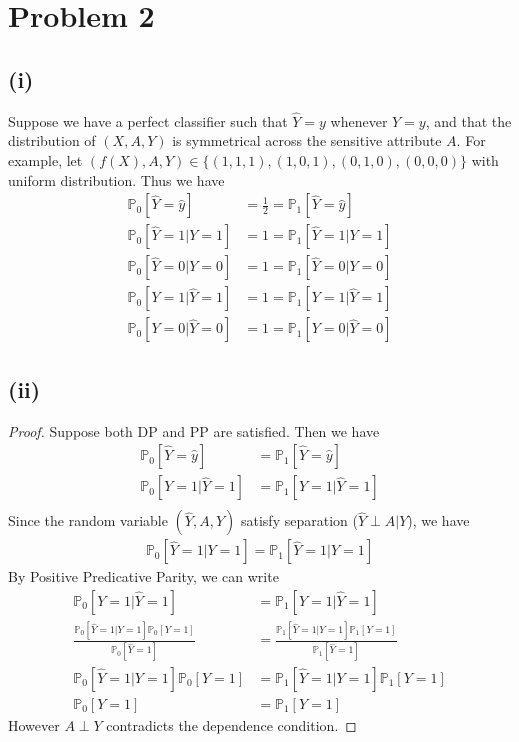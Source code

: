 \documentclass[twoside,11pt]{homework}
\begin{document}
\section*{Problem 2}
\subsection*{(i)}
	Suppose we have a perfect classifier such that $\hat{Y}=y$ whenever $Y=y$,
	and that the distribution of $(X,A,Y)$ is symmetrical across the sensitive attribute $A$.
	For example, let $(f(X),A,Y)\in \{(1,1,1),(1,0,1),(0,1,0),(0,0,0)\}$ with uniform distribution.
	Thus we have
	\begin{align*}
		\mathbb{P}_0[\hat{Y}=\hat{y}] &= \frac{1}{2} = \mathbb{P}_1 [\hat{Y}=\hat{y}] \tag{DP}  \\
		\mathbb{P}_0[\hat{Y}=1|Y=1] &= 1 = \mathbb{P}_1 [\hat{Y}=1|Y=1] \tag{True Positive EO} \\
		\mathbb{P}_0[\hat{Y}=0|Y=0] &= 1 = \mathbb{P}_1 [\hat{Y}=0|Y=0] \tag{True Negative EO} \\
		\mathbb{P}_0[Y=1 | \hat{Y}=1] &=1 = \mathbb{P}_1[Y=1 | \hat{Y}=1] \tag{Positive PP} \\
		\mathbb{P}_0[Y=0 | \hat{Y}=0] &=1 = \mathbb{P}_1[Y=0 | \hat{Y}=0] \tag{Negative PP}
	\end{align*}
\subsection*{(ii)}
	\begin{proof}
		Suppose both DP and PP are satisfied.
		Then we have
		\begin{align*}
			\mathbb{P}_0[\hat{Y}=\hat{y}] &= \mathbb{P}_1 [\hat{Y}=\hat{y}] \tag{DP} \\
			\mathbb{P}_0[Y=1 | \hat{Y}=1] &= \mathbb{P}_1[Y=1 | \hat{Y}=1] \tag{Positive PP} \\
		\end{align*}
		Since the random variable $(\hat{Y},A,Y)$ satisfy separation ($\hat{Y}\perp A|Y$), we have
		\begin{align*}
			\mathbb{P}_0[\hat{Y}=1|Y=1] = \mathbb{P}_1[\hat{Y}=1|Y=1]
		\end{align*}
		By Positive Predicative Parity, we can write
		\begin{align*}
			\mathbb{P}_0[Y=1 | \hat{Y}=1] &= \mathbb{P}_1[Y=1 | \hat{Y}=1] \\
			\frac{\mathbb{P}_0[\hat{Y}=1|Y=1] \mathbb{P}_0[Y=1] }{\mathbb{P}_0[\hat{Y}=1] }
			&= \frac{\mathbb{P}_1[\hat{Y}=1|Y=1] \mathbb{P}_1[Y=1] }{ \mathbb{P}_1[\hat{Y}=1] } \tag{Bayes Rule} \\
			\mathbb{P}_0[\hat{Y}=1|Y=1] \mathbb{P}_0[Y=1] &= \mathbb{P}_1[\hat{Y}=1|Y=1] \mathbb{P}_1[Y=1] \tag{DP}\\
			\mathbb{P}_0[Y=1] &= \mathbb{P}_1[Y=1] \tag{Separation Condition}
		\end{align*}
		However $A\perp Y$ contradicts the dependence condition.
	\end{proof}
\end{document}
